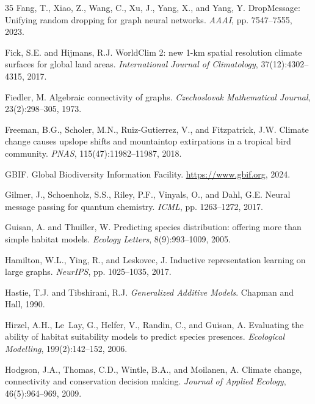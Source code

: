 \documentclass[11pt,a4paper]{article}
\begin{document}
\begin{thebibliography}{35}
Fang, T., Xiao, Z., Wang, C., Xu, J., Yang, X., and Yang, Y.
\newblock DropMessage: Unifying random dropping for graph neural networks.
\newblock \emph{AAAI}, pp. 7547--7555, 2023.

Fick, S.E. and Hijmans, R.J.
\newblock WorldClim 2: new 1-km spatial resolution climate surfaces for global
  land areas.
\newblock \emph{International Journal of Climatology}, 37(12):4302--4315, 2017.

Fiedler, M.
\newblock Algebraic connectivity of graphs.
\newblock \emph{Czechoslovak Mathematical Journal}, 23(2):298--305, 1973.

Freeman, B.G., Scholer, M.N., Ruiz-Gutierrez, V., and Fitzpatrick, J.W.
\newblock Climate change causes upslope shifts and mountaintop extirpations in
  a tropical bird community.
\newblock \emph{PNAS}, 115(47):11982--11987, 2018.

GBIF.
\newblock Global Biodiversity Information Facility.
\newblock \url{https://www.gbif.org}, 2024.

Gilmer, J., Schoenholz, S.S., Riley, P.F., Vinyals, O., and Dahl, G.E.
\newblock Neural message passing for quantum chemistry.
\newblock \emph{ICML}, pp. 1263--1272, 2017.

Guisan, A. and Thuiller, W.
\newblock Predicting species distribution: offering more than simple habitat
  models.
\newblock \emph{Ecology Letters}, 8(9):993--1009, 2005.

Hamilton, W.L., Ying, R., and Leskovec, J.
\newblock Inductive representation learning on large graphs.
\newblock \emph{NeurIPS}, pp. 1025--1035, 2017.

Hastie, T.J. and Tibshirani, R.J.
\newblock \emph{Generalized Additive Models}.
\newblock Chapman and Hall, 1990.

Hirzel, A.H., Le~Lay, G., Helfer, V., Randin, C., and Guisan, A.
\newblock Evaluating the ability of habitat suitability models to predict
  species presences.
\newblock \emph{Ecological Modelling}, 199(2):142--152, 2006.

Hodgson, J.A., Thomas, C.D., Wintle, B.A., and Moilanen, A.
\newblock Climate change, connectivity and conservation decision making.
\newblock \emph{Journal of Applied Ecology}, 46(5):964--969, 2009.


\end{thebibliography}
\end{document}
